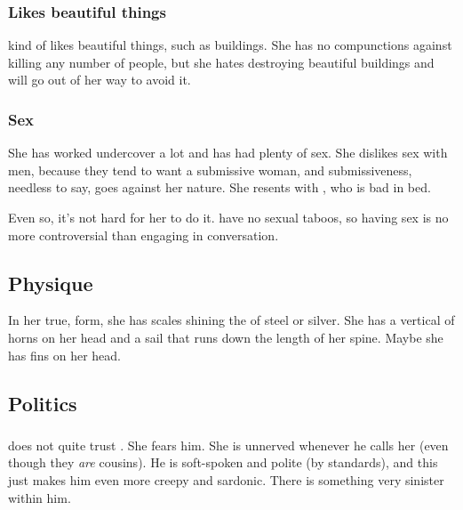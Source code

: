 \subsubsection{Likes beautiful things}
\Nzessuacrith{} kind of likes beautiful things, such as buildings. 
She has no compunctions against killing any number of people, but she hates destroying beautiful buildings and will go out of her way to avoid it.





\subsubsection{Sex}
She has worked undercover a lot and has had plenty of sex. 
She dislikes sex with \human{} men, because they tend to want a submissive woman, and submissiveness, needless to say, goes against her \draconic{} nature. 
She resents  with , who is bad in bed. 

Even so, it's not hard for her to do it. 
\Dragons{} have no sexual taboos, so having sex is no more controversial than engaging in conversation. 










\subsection{Physique}
In her true, \draconian{} form, she has scales shining the \colour of steel or silver. 
She has a vertical  of horns on her head and a sail that runs down the length of her spine. 
Maybe she has fins on her head. 









\subsection{Politics}





\subsubsection{\Vizsherioch}
\Nzessuacrith{} does not quite trust . 
She fears him. 
She is unnerved whenever he calls her  (even though they \emph{are} cousins). 
He is soft-spoken and polite (by \draconic{} standards), and this just makes him even more creepy and sardonic. 
There is something very sinister within him. 

